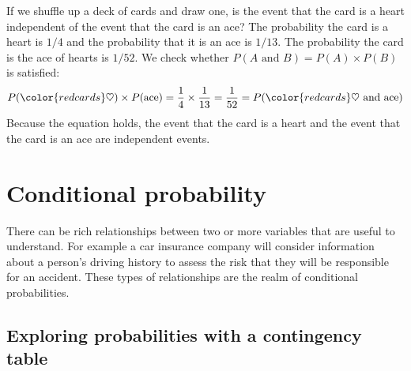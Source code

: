 \begin{examplewrap}
\begin{nexample}{If we shuffle up a deck of cards and draw one, is the event that the card is a heart independent of the event that the card is an ace?}
The probability the card is a heart is $1/4$ and the probability that it is an ace is $1/13$. The probability the card is the ace of hearts is $1/52$.
We check whether $P(A \text{ and }B) = P(A) \times  P(B)$
is satisfied:
\begin{align*}
P({\color{redcards}\heartsuit})\times P(\text{ace}) = \frac{1}{4}\times \frac{1}{13} = \frac{1}{52} 
					= P({\color{redcards}\heartsuit}\text{ and ace})
\end{align*}
Because the equation holds, the event that the card is a heart and the event that the card is an ace are independent events.
\end{nexample}
\end{examplewrap}


{}




\section{Conditional probability}
\label{conditionalProbabilitySection}

There can be rich relationships between two or more
variables that are useful to understand.
For example a car insurance company will consider
information about a person's driving history to assess
the risk that they will be responsible for an accident.
These types of relationships are the realm of conditional
probabilities.


\subsection{Exploring probabilities with a contingency table}


\newcommand{\fashN}{1822}
\newcommand{\fashYY}{197}
\newcommand{\fashYN}{22}
\newcommand{\fashYA}{219}
\newcommand{\fashNY}{112}
\newcommand{\fashNN}{1491}
\newcommand{\fashNA}{1603}
\newcommand{\fashAY}{309}
\newcommand{\fashAN}{1513}
\newcommand{\fashAA}{\fashN{}}
\newcommand{\fashCYPY}{0.96}
\newcommand{\fashCYPN}{0.04}
\newcommand{\fashCNPY}{0.07}
\newcommand{\fashCNPN}{0.93}

